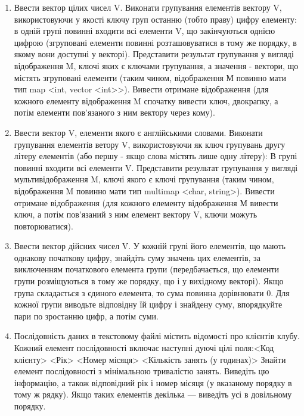 \documentclass[a5paper,titlepage,openany,twoside,
]
{book_unv}%
\begin{document}
\begin{enumerate}
\begin{enumerate}
\begin{enumerate}
\item
Ввести вектор цілих чисел V. Виконати групування елементів вектору V,
 використовуючи у якості ключу груп останню (тобто праву) 
цифру елементу: в одній групі повинні входити всі елементи V,
що закінчуються однією цифрою (згруповані 
елементи повинні розташовуватися в тому же порядку, в якому вони
доступні у векторі). Представити результат групування у вигляді відображення M, 
ключі яких є ключами групування, а значення - вектори, що містять згруповані
елементи (таким чином, відображення М повинно мати тип
map <int, vector <int>>). Вивести отримане відображення (для кожного
елементу відображення M спочатку вивести ключ, двокрапку, а потім елементи
пов'язаного з ним вектору через кому).



\item
Ввести вектор V, елементи якого є англійськими словами. 
Виконати групування елементів ветору V, використовуючи як ключ групувань 
другу літеру елементів (або першу - якщо слова містять лише одну літеру):
В групі повинні входити всі елементи V. Представити результат групування
у вигляді мультивідображення M, ключі якого є ключі
групування (таким чином, відображення M повинно мати тип multimap <char, string>).
Вивести отримане відображення (для кожного елементу відображення
М вивести ключ, а потім пов'язаний з ним елемент вектору V,
 ключи можуть повторюватися).

\item
Ввести вектор дійсних чисел V. У кожній групі його елементів, що мають однакову початкову цифру,
 знайдіть суму значень цих елементів, за виключенням початкового елемента групи (передбачається, що
елементи групи розміщуються в тому же порядку, що і у вихідному
векторі). Якщо група складається з єдиного елемента, то сума
повинна дорівнювати 0. Для кожної групи виводьте відповідну
їй цифру і знайдену суму, впорядкуйте пари по зростанню цифр, а потім суми. 

\item
Послідовність даних в текстовому файлі містить відомості про клієнтів
клубу. Кожний елемент послідовності включає наступні
дуючі цілі поля:<Код клієнту> <Рік> <Номер місяця> <Кількість занять (у годинах)>
Знайти елемент послідовності з мінімальною тривалістю занять.
 Виведіть цю інформацію, а також відповідний рік і номер місяця 
(у вказаному порядку в тому ж рядку).
Якщо таких елементів декілька --- виведіть усі в довільному порядку.


\end{enumerate}
\end{enumerate}
\end{enumerate}
\end{document}
